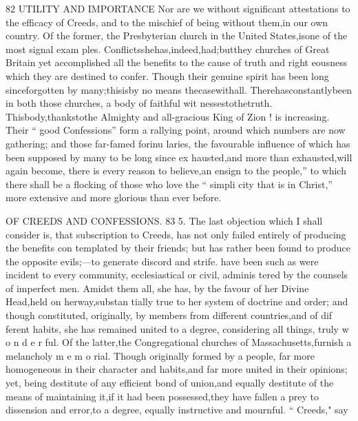 \documentclass[
]{book}
\begin{document}
82 UTILITY AND IMPORTANCE
Nor are we without significant attestations to the efficacy of Creeds, and to the mischief
of being without them,in our own country. Of the former, the Presbyterian church in the United States,isone of the most signal exam ples. Conflictsshehas,indeed,had;butthey
churches of Great Britain yet accomplished
all the benefits to the cause of truth and right
eousness which they are destined to confer.
Though their genuine spirit has been long
sinceforgotten by many;thisisby no means thecasewithall. Therehasconstantlybeen
in both those churches, a body of faithful wit nessestothetruth. Thisbody,thankstothe Almighty and all-gracious King of Zion ! is increasing. Their `` good Confessions'' form a rallying point, around which numbers are now gathering; and those far-famed forinu laries, the favourable influence of which has been supposed by many to be long since ex
hausted,and more than exhausted,will again become, there is every reason to believe,an
ensign to the people,'' to which there shall be a flocking of those who love the `` simpli city that is in Christ,'' more extensive and more glorious than ever before.

OF CREEDS AND CONFESSIONS. 83
5. The last objection which I shall consider is, that subscription to Creeds, has not only failed entirely of producing the benefits con templated by their friends; but has rather been found to produce the opposite evils;---to generate discord and strife.
have been such as were incident to every
community, ecclesiastical or civil, adminis
tered by the counsels of imperfect men.
Amidst them all, she has, by the favour of
her Divine Head,held on herway,substan
tially true to her system of doctrine and
order; and though constituted, originally, by
members from different countries,and of dif
ferent habits, she has remained united to a
degree, considering all things, truly w o n d e r
ful. Of the latter,the Congregational churches
of Massachusetts,furnish a melancholy m e m o
rial. Though originally formed by a people, far more homogeneous in their character and
habits,and far more united in their opinions; yet, being destitute of any efficient bond of
union,and equally destitute of the means of maintaining it,if it had been possessed,they have fallen a prey to dissension and error,to a degree, equally instructive and mournful.
`` Creeds," say
\end{document}
